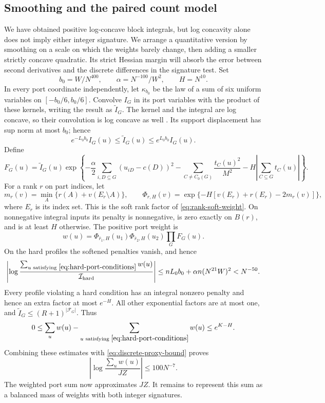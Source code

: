 \subsection{Smoothing and the paired count model}

We have obtained positive log-concave block integrals, but log concavity
alone does not imply either integer signature. We arrange a quantitative
version by smoothing on a scale on which the weights barely change,
then adding a smaller strictly concave quadratic.
Its strict Hessian margin will absorb the error between second
derivatives and the discrete differences in the signature test.
Set
\begin{equation}\label{eq:smoothing-scales}
 b_0=W/N^{400},\qquad \alpha=N^{-100}/W^2,\qquad H=N^{10}.
\end{equation}
In every port coordinate independently, let $\kappa_{b_0}$ be the law
of a sum of six uniform variables on $[-b_0/6,b_0/6]$. Convolve $I_G$
in its port variables with the product of these kernels, writing the
result as $\widetilde I_G$. The kernel and the integral are log concave,
so their convolution is log concave as well \cite{Prekopa1973}.
Its support displacement has sup norm at most $b_0$; hence
\begin{equation}\label{eq:smoothing-error}
 e^{-L_0b_0}I_G(u)\le\widetilde I_G(u)\le e^{L_0b_0}I_G(u).
\end{equation}
Define
\begin{equation}\label{eq:block-factor}
 F_G(u)=\widetilde I_G(u)\exp\left\{
 -\frac\alpha2\sum_{i,D\subseteq G}(u_{iD}-c(D))^2
 -\sum_{C\ne C_0(G)}\frac{t_C(u)^2}{M^2}
 -H\left|\sum_{C\subseteq G}t_C(u)\right|\right\}.
\end{equation}
For a rank $r$ on part indices, let
\[
 m_r(v)=\min_A\{r(A)+v(E_r\setminus A)\},\qquad
 \Phi_{r,H}(v)=\exp\{-H[v(E_r)+r(E_r)-2m_r(v)]\},
\]
where $E_r$ is its index set. This is the soft rank factor of
\eqref{eq:rank-soft-weight}. On nonnegative integral inputs its penalty
is nonnegative, is zero exactly on $B(r)$, and is at least $H$ otherwise.
The positive port weight is
\begin{equation}\label{eq:positive-port-weight}
 w(u)=\Phi_{\bar r_1,H}(u_1)\Phi_{\bar r_2,H}(u_2)\prod_GF_G(u).
\end{equation}
On the hard profiles the softened penalties vanish, and hence
\[
 \left|\log\frac{\sum_{u\text{ satisfying }\eqref{eq:hard-port-conditions}}
                                  w(u)}{\mathcal I_{\rm hard}}\right|
 \le nL_0b_0+\alpha n(N^{21}W)^2<N^{-50}.
\]
Every profile violating a hard condition has an integral nonzero
penalty and hence an extra factor at most $e^{-H}$. All other
exponential factors are at most one, and
$\widetilde I_G\le(R+1)^{|\mathcal F_G|}$. Thus
\[
 0\le\sum_u w(u)
      -\sum_{u\text{ satisfying }\eqref{eq:hard-port-conditions}}w(u)
      \le e^{K-H}.
\]
Combining these estimates with
\eqref{eq:discrete-proxy-bound} proves
\begin{equation}\label{eq:positive-proxy-bound}
 \left|\log\frac{\sum_u w(u)}{JZ}\right|\le100N^{-7}.
\end{equation}
The weighted port sum now approximates $JZ$. It remains to represent
this sum as a balanced mass of weights with both integer signatures.

